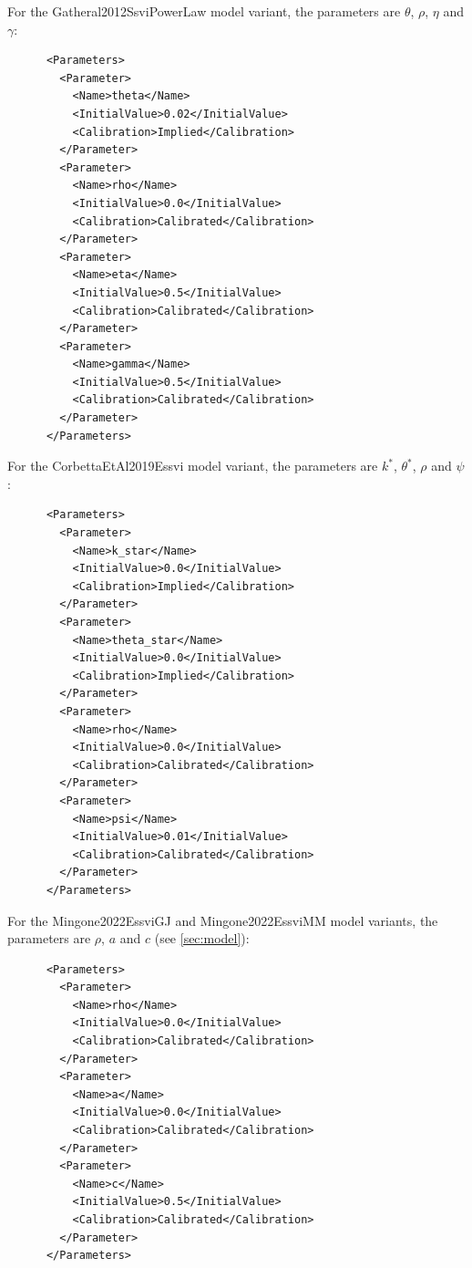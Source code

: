 \documentclass{amsart}
\theoremstyle{plain}
\numberwithin{equation}{section}
\begin{document}
For the Gatheral2012SsviPowerLaw model variant, the parameters are $\theta$, $\rho$, $\eta$ and $\gamma$:

\begin{verbatim}
      <Parameters>
        <Parameter>
          <Name>theta</Name>
          <InitialValue>0.02</InitialValue>
          <Calibration>Implied</Calibration>
        </Parameter>
        <Parameter>
          <Name>rho</Name>
          <InitialValue>0.0</InitialValue>
          <Calibration>Calibrated</Calibration>
        </Parameter>
        <Parameter>
          <Name>eta</Name>
          <InitialValue>0.5</InitialValue>
          <Calibration>Calibrated</Calibration>
        </Parameter>
        <Parameter>
          <Name>gamma</Name>
          <InitialValue>0.5</InitialValue>
          <Calibration>Calibrated</Calibration>
        </Parameter>
      </Parameters>
\end{verbatim}

For the CorbettaEtAl2019Essvi model variant, the parameters are $k^*$, $\theta^*$, $\rho$ and $\psi$:

\begin{verbatim}
      <Parameters>
        <Parameter>
          <Name>k_star</Name>
          <InitialValue>0.0</InitialValue>
          <Calibration>Implied</Calibration>
        </Parameter>
        <Parameter>
          <Name>theta_star</Name>
          <InitialValue>0.0</InitialValue>
          <Calibration>Implied</Calibration>
        </Parameter>
        <Parameter>
          <Name>rho</Name>
          <InitialValue>0.0</InitialValue>
          <Calibration>Calibrated</Calibration>
        </Parameter>
        <Parameter>
          <Name>psi</Name>
          <InitialValue>0.01</InitialValue>
          <Calibration>Calibrated</Calibration>
        </Parameter>
      </Parameters>
\end{verbatim}

For the Mingone2022EssviGJ and Mingone2022EssviMM model variants, the parameters are $\rho$, $a$ and $c$ (see
\ref{sec:model}):

\begin{verbatim}
      <Parameters>
        <Parameter>
          <Name>rho</Name>
          <InitialValue>0.0</InitialValue>
          <Calibration>Calibrated</Calibration>
        </Parameter>
        <Parameter>
          <Name>a</Name>
          <InitialValue>0.0</InitialValue>
          <Calibration>Calibrated</Calibration>
        </Parameter>
        <Parameter>
          <Name>c</Name>
          <InitialValue>0.5</InitialValue>
          <Calibration>Calibrated</Calibration>
        </Parameter>
      </Parameters>
\end{verbatim}
\end{document}
